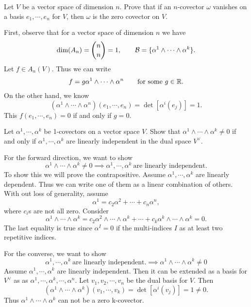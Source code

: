 \begin{problem}
	Let $ V $ be a vector space of dimension $ n $. Prove that if an $ n $-covector $ \omega $ vanishes on a basis $ e_1,\cdots,e_n $ for $ V $, then $ \omega $ is the zero covector on $ V $.
\end{problem}

\begin{solution}
	First, observe that for a vector space of dimension $ n $ we have
	\[ \dim(A_n) = \binom{n}{n} = 1, \qquad \mathcal{B}= \{\alpha^1 \wedge \cdots \wedge \alpha^k\}. \]
	Let $ f \in A_n(V) $. Thus we can write
	\[ f = g \alpha^1\wedge \cdots \wedge \alpha^n  \qquad \text{for some}\ g \in \mathbb{R}.\] 
	On the other hand, we know
	\[ (\alpha^1\wedge \cdots\wedge \alpha^n)(e_1,\cdots,e_n) = \det \left[ \alpha^i(e_j) \right] = 1.\]
	This $ f(e_1,\cdots, e_n) = 0 $ if and only if $ g = 0 $.
\end{solution}

\begin{problem}
	Let $ \alpha^1,\cdots,\alpha^k $ be 1-covectors on a vector space $ V $. Show that $ \alpha^1 \wedge \cdots \wedge \alpha^k \neq 0 $ if and only if $ \alpha^1, \cdots, \alpha^k $ are linearly independent in the dual space $ V^{\vee} $.
\end{problem}
\begin{solution}
	For the forward direction, we want to show
	\[ \alpha^1 \wedge \cdots \wedge \alpha^k \neq 0 \implies \alpha^1,\cdots,\alpha^k\ \text{are linearly independent.} \]
	To show this we will prove the contrapositive. Assume $ \alpha^1,\cdots,\alpha^k $ are linearly dependent. Thus we can write one of them as a linear combination of others. With out loss of generality, assume 
	\[ \alpha^1 = c_2 \alpha^2 + \cdots + c_n \alpha^n, \]
	where $ c_i $s are not all zero. Consider
	\[ \alpha^1\wedge \cdots\wedge \alpha^k  = c_2 \alpha^2 \wedge \cdots\wedge\alpha^k + \cdots +  c_k \alpha^k \wedge \cdots \wedge \alpha^{k} = 0. \]
	The last equality is true since $ \alpha^I = 0 $ if the multi-indices $ I $ as at least two repetitive indices. 
	
	For the converse, we want to show
	\[\alpha^1,\cdots,\alpha^k\ \text{are linearly independent.} \implies \alpha^1 \wedge \cdots \wedge \alpha^k \neq 0 \]
	Assume $ \alpha^1,\cdots,\alpha^k $ are linearly independent. Then it can be extended as a basis for $ V^\vee $ as as $ \alpha^1,\cdots,\alpha^k,\cdots,\alpha^n $. Let $ v_1,v_2,\cdots,v_n $ be the dual basis for $ V $. Then
	\[ (\alpha^1\wedge\cdots\wedge\alpha^k) (v_1,\cdots,v_k) = \det\left[ \alpha^i(v_j) \right] = 1 \neq 0.  \]
	Thus $ \alpha^1\wedge\cdots\wedge\alpha^k $ can not be a zero k-covector.
\end{solution}

